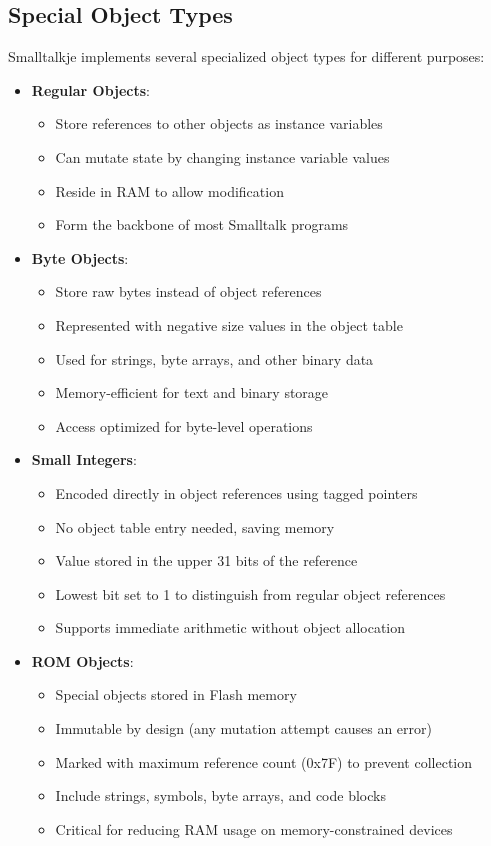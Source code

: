 \documentclass[12pt,a4paper]{report}
\begin{document}
\subsection{Special Object Types}
Smalltalkje implements several specialized object types for different purposes:

\begin{itemize}
    \item \textbf{Regular Objects}:
    \begin{itemize}
        \item Store references to other objects as instance variables
        \item Can mutate state by changing instance variable values
        \item Reside in RAM to allow modification
        \item Form the backbone of most Smalltalk programs
    \end{itemize}
    
    \item \textbf{Byte Objects}:
    \begin{itemize}
        \item Store raw bytes instead of object references
        \item Represented with negative size values in the object table
        \item Used for strings, byte arrays, and other binary data
        \item Memory-efficient for text and binary storage
        \item Access optimized for byte-level operations
    \end{itemize}
    
    \item \textbf{Small Integers}:
    \begin{itemize}
        \item Encoded directly in object references using tagged pointers
        \item No object table entry needed, saving memory
        \item Value stored in the upper 31 bits of the reference
        \item Lowest bit set to 1 to distinguish from regular object references
        \item Supports immediate arithmetic without object allocation
    \end{itemize}
    
    \item \textbf{ROM Objects}:
    \begin{itemize}
        \item Special objects stored in Flash memory
        \item Immutable by design (any mutation attempt causes an error)
        \item Marked with maximum reference count (0x7F) to prevent collection
        \item Include strings, symbols, byte arrays, and code blocks
        \item Critical for reducing RAM usage on memory-constrained devices
    \end{itemize}
\end{itemize}
\end{document}

